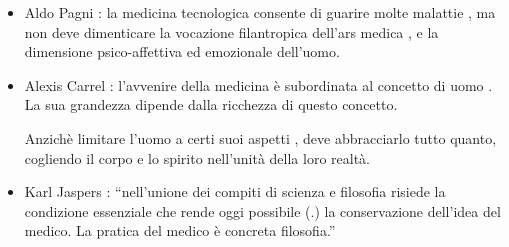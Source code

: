 \begin{itemize}
\item
  Aldo Pagni : la medicina tecnologica consente di guarire molte
  malattie , ma non deve dimenticare la vocazione filantropica dell'ars
  medica , e la dimensione psico-affettiva ed emozionale dell'uomo.
\item
  Alexis Carrel : l'avvenire della medicina è subordinata al concetto di
  uomo . La sua grandezza dipende dalla ricchezza di questo concetto.

  Anzichè limitare l'uomo a certi suoi aspetti , deve abbracciarlo tutto
  quanto, cogliendo il corpo e lo spirito nell'unità della loro realtà.
\item
  Karl Jaspers : ``nell'unione dei compiti di scienza e filosofia
  risiede la condizione essenziale che rende oggi possibile (.) la
  conservazione dell'idea del medico. La pratica del medico è concreta
  filosofia.''
\end{itemize}
